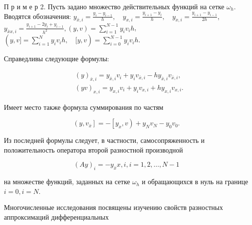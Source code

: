 \documentclass[10pt]{article}
\begin{document}
П р и м е р 2. Пусть задано множество действительных функций на сетке $\omega_{h}$. Вводятся обозначения: $y_{\bar{x}, i}=\frac{y_{i}-y_{i-1}}{h}, \quad y_{x, i}=\frac{y_{i+1}-y_{i}}{h}, \quad y_{\dot{x}, i}=\frac{y_{i+1}-y_{i-1}}{2 h}$, $y_{\bar{x} x, i}=\frac{y_{i+1}-2 y_{i}+y_{i-1}}{h^{2}},(y, v)=\sum_{i=1}^{N-1} y_{i} v_{i} h$, $(y, v]=\sum_{i=1}^{N} y_{i} v_{i} h, \quad[y, v)=\sum_{i=0}^{N-1} y_{i} v_{i} h$.



Справедливы следующие формулы:



\[

\begin{aligned}

& (y)_{\bar{x}, i}=y_{\bar{x}, i} v_{i}+y_{i} v_{\bar{x}, i}-h y_{\bar{x}, i} v_{\bar{x}, i}, \\

& (y v)_{x, i}=y_{x, i} v_{i}+y_{i} v_{x, i}+h y_{x, i} v_{x, i} .

\end{aligned}

\]



Имеет место также формула суммирования по частям



\[

\left(y, v_{\bar{x}}\right]=-\left[y_{x}, v\right)+y_{N} v_{N}-y_{0} v_{0} .

\]



Из последней формулы следует, в частности, самосопряженность и положительность оператора второй разностной производной



\[

(A y)_{i}=-y_{\bar{x}} x, i, i=1,2, \ldots, N-1

\]



на множестве функций, заданных на сетке $\omega_{h}$ и обращающихся в нуль на границе $i=0, i=N$.



Многочисленные исследования посвящены изучению свойств разностных аппроксимаций дифференциальных
\end{document}
